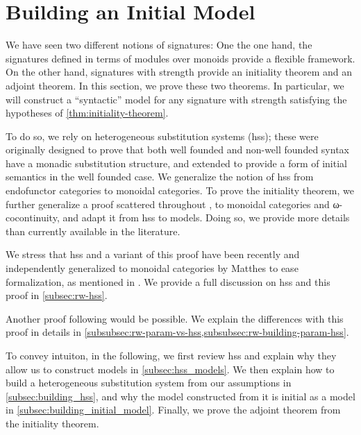 \section{Building an Initial Model}
\label{sec:building_initial_model}

%

We have seen two different notions of signatures:
One the one hand, the signatures defined in terms of modules over monoids provide a flexible framework.
On the other hand, signatures with strength provide an initiality theorem and an adjoint theorem.
In this section, we prove these two theorems.
In particular, we will construct a ``syntactic'' model for any signature with
strength satisfying the hypotheses of \cref{thm:initiality-theorem}.

%
To do so, we rely on heterogeneous substitution systems (hss); these were originally
designed to prove that both well founded and non-well founded syntax \cite{Hss04}
have a monadic substitution structure, and extended to provide a form of initial
semantics \cite{HssRevisited15} in the well founded case.
%
%
We generalize the notion of hss from endofunctor categories to monoidal categories.
To prove the initiality theorem, we further generalize a proof scattered throughout
\cite{Hss04,DeBruijnasNestedDatatype99,HssRevisited15,HssUntypedUniMath19},
to monoidal categories and ω-cocontinuity, and adapt it from hss to models.
Doing so, we provide more details than currently available in the literature.

\begin{related Work}
  We stress that hss and a variant of this proof have been recently and
  independently generalized to monoidal categories by Matthes to ease
  formalization, as mentioned in \cite[Section 4.4]{HssNonWellfounded24}.
  We provide a full discussion on hss and this proof in \cref{subsec:rw-hss}.
\end{related Work}

\begin{related Work}
  Another proof following \cite{ListObjects17} would be possible.
  We explain the differences with this proof in details in
  \cref{subsubsec:rw-param-vs-hss,subsubsec:rw-building-param-hss}.
\end{related Work}

To convey intuiton, in the following, we first review hss and explain why
they allow us to construct models in \cref{subsec:hss_models}.
%
We then explain how to build a heterogeneous substitution system from our
assumptions in \cref{subsec:building_hss}, and why the model constructed from it
is initial as a model in \cref{subsec:building_initial_model}.
Finally, we prove the adjoint theorem from the initiality theorem.

